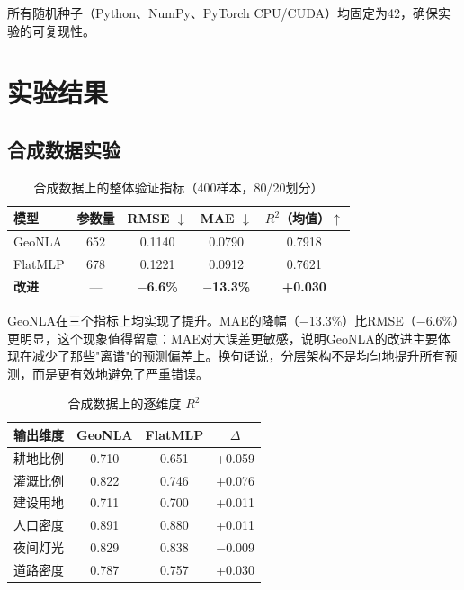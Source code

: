 \documentclass[11pt,a4paper]{article}
\begin{document}
所有随机种子（Python、NumPy、PyTorch CPU/CUDA）均固定为42，确保实验的可复现性。

\section{实验结果}
\label{sec:results}

\subsection{合成数据实验}

\begin{table}[htbp]
\centering
\caption{合成数据上的整体验证指标（400样本，80/20划分）}
\label{tab:synth_overall}
\renewcommand{\arraystretch}{1.2}
\begin{tabular}{@{}lcccc@{}}
\toprule
模型 & 参数量 & RMSE $\downarrow$ & MAE $\downarrow$ & $R^2$（均值）$\uparrow$ \\
\midrule
GeoNLA & 652 & 0.1140 & 0.0790 & 0.7918 \\
FlatMLP & 678 & 0.1221 & 0.0912 & 0.7621 \\
\textbf{改进} & — & \textbf{$-$6.6\%} & \textbf{$-$13.3\%} & \textbf{+0.030} \\
\bottomrule
\end{tabular}
\end{table}

GeoNLA在三个指标上均实现了提升。MAE的降幅（$-$13.3\%）比RMSE（$-$6.6\%）更明显，这个现象值得留意：MAE对大误差更敏感，说明GeoNLA的改进主要体现在减少了那些"离谱"的预测偏差上。换句话说，分层架构不是均匀地提升所有预测，而是更有效地避免了严重错误。

\begin{table}[htbp]
\centering
\caption{合成数据上的逐维度 $R^2$}
\label{tab:synth_perdim}
\renewcommand{\arraystretch}{1.2}
\begin{tabular}{@{}lccc@{}}
\toprule
输出维度 & GeoNLA & FlatMLP & $\Delta$ \\
\midrule
耕地比例 & 0.710 & 0.651 & +0.059 \\
灌溉比例 & 0.822 & 0.746 & +0.076 \\
建设用地 & 0.711 & 0.700 & +0.011 \\
人口密度 & 0.891 & 0.880 & +0.011 \\
夜间灯光 & 0.829 & 0.838 & $-$0.009 \\
道路密度 & 0.787 & 0.757 & +0.030 \\
\bottomrule
\end{tabular}
\end{table}
\end{document}
